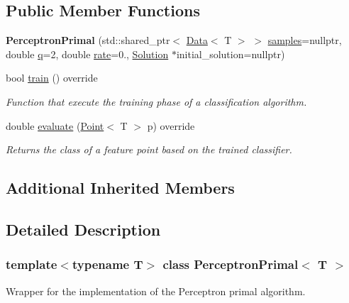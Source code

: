 \subsection*{Public Member Functions}
\begin{DoxyCompactItemize}
\item 
\mbox{\label{class_perceptron_primal_ae0fac9ce6fde7a106b8194bb08104418}} 
{\bfseries Perceptron\+Primal} (std\+::shared\+\_\+ptr$<$ \hyperlink{class_data}{Data}$<$ T $>$ $>$ \hyperlink{class_classifier_a0000b47a2e0784ada4c52d7046c4adb8}{samples}=nullptr, double \hyperlink{class_primal_classifier_ae30c00c25bce4b1623baa54b5e2812b4}{q}=2, double \hyperlink{class_classifier_a7b1c4ef87631bd9e46682e5bc4315111}{rate}=0., \hyperlink{class_solution}{Solution} $\ast$initial\+\_\+solution=nullptr)
\item 
bool \hyperlink{class_perceptron_primal_ac6cafe7a8fabfb607761024ce60a6861}{train} () override
\begin{DoxyCompactList}\small\item\em Function that execute the training phase of a classification algorithm. \end{DoxyCompactList}\item 
double \hyperlink{class_perceptron_primal_a547d98d8d61480d5bc44fe759c3a8e28}{evaluate} (\hyperlink{class_point}{Point}$<$ T $>$ p) override
\begin{DoxyCompactList}\small\item\em Returns the class of a feature point based on the trained classifier. \end{DoxyCompactList}\end{DoxyCompactItemize}
\subsection*{Additional Inherited Members}


\subsection{Detailed Description}
\subsubsection*{template$<$typename T$>$\newline
class Perceptron\+Primal$<$ T $>$}

Wrapper for the implementation of the Perceptron primal algorithm. 

